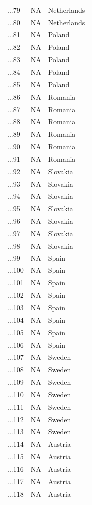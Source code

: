 \begin{longtable}{lrl}
...79 & NA & Netherlands\\
...80 & NA & Netherlands\\
\addlinespace
...81 & NA & Poland\\
...82 & NA & Poland\\
...83 & NA & Poland\\
...84 & NA & Poland\\
...85 & NA & Poland\\
\addlinespace
...86 & NA & Romania\\
...87 & NA & Romania\\
...88 & NA & Romania\\
...89 & NA & Romania\\
...90 & NA & Romania\\
\addlinespace
...91 & NA & Romania\\
...92 & NA & Slovakia\\
...93 & NA & Slovakia\\
...94 & NA & Slovakia\\
...95 & NA & Slovakia\\
\addlinespace
...96 & NA & Slovakia\\
...97 & NA & Slovakia\\
...98 & NA & Slovakia\\
...99 & NA & Spain\\
...100 & NA & Spain\\
\addlinespace
...101 & NA & Spain\\
...102 & NA & Spain\\
...103 & NA & Spain\\
...104 & NA & Spain\\
...105 & NA & Spain\\
\addlinespace
...106 & NA & Spain\\
...107 & NA & Sweden\\
...108 & NA & Sweden\\
...109 & NA & Sweden\\
...110 & NA & Sweden\\
\addlinespace
...111 & NA & Sweden\\
...112 & NA & Sweden\\
...113 & NA & Sweden\\
...114 & NA & Austria\\
...115 & NA & Austria\\
\addlinespace
...116 & NA & Austria\\
...117 & NA & Austria\\
...118 & NA & Austria\\

\end{longtable}
